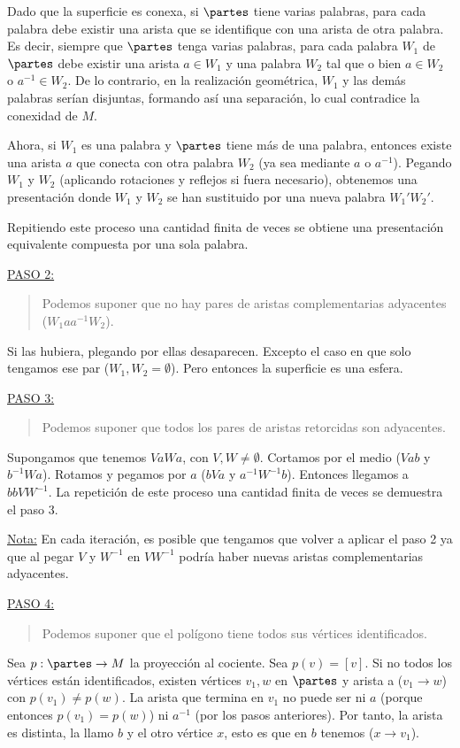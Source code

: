 {    \noindent Dado que la superficie es conexa, si $\partes$ tiene varias palabras, para cada palabra debe existir una arista que se identifique con una arista de otra palabra. 
    Es decir, siempre que $\partes$ tenga varias palabras, para cada palabra $W_1$ de $\partes$ debe existir una arista $a \in W_1$ y una palabra $W_2$ tal que 
    o bien $a\in W_2$ o $a^{-1}\in W_2$. De lo contrario, en la realización geométrica, $W_1$ y las demás palabras serían disjuntas, formando así una separación, 
    lo cual contradice la conexidad de $M$. 

    \vspace{0.5em}
    Ahora, si $W_1$ es una palabra y $\partes$ tiene más de una palabra, entonces existe una arista $a$ que conecta con otra palabra $W_2$ 
    (ya sea mediante $a$ o $a^{-1}$). Pegando $W_1$ y $W_2$ (aplicando rotaciones y reflejos si fuera necesario), 
    obtenemos una presentación donde $W_1$ y $W_2$ se han sustituido por una nueva palabra $W_1'W_2'$. 
    
    Repitiendo este proceso una cantidad finita de veces se obtiene una presentación equivalente compuesta por una sola palabra. \newline

    \underline{PASO 2:} 
    \begin{quote}
        Podemos suponer que no hay pares de aristas complementarias adyacentes ($W_1aa^{-1}W_2$).
    \end{quote}
    Si las hubiera, plegando por ellas desaparecen. Excepto el caso en que solo tengamos ese par ($W_1, W_2 = \emptyset$). Pero entonces la superficie es una esfera. \newline

    \underline{PASO 3:} 
    \begin{quote}
        Podemos suponer que todos los pares de aristas retorcidas son adyacentes.
    \end{quote}
    Supongamos que tenemos $VaWa$, con $V,W \ne \emptyset$. Cortamos por el medio ($Vab$ y $b^{-1}Wa$). Rotamos y pegamos por $a$ ($bVa$ y $a^{-1}W^{-1}b$). Entonces llegamos a $bbVW^{-1}$. La repetición de este proceso una cantidad finita de veces se demuestra el paso 3. 

    \underline{Nota:} En cada iteración, es posible que tengamos que volver a aplicar el paso 2 ya que al pegar $V$ y $W^{-1}$ en $V W^{-1}$ podría haber nuevas aristas complementarias adyacentes. \newline

    \underline{PASO 4:} 
    \begin{quote}
        Podemos suponer que el polígono tiene todos sus vértices identificados.
    \end{quote}
    Sea $p:\partes \to M$ la proyección al cociente. Sea $p(v)=[v]$. Si no todos los vértices están identificados, existen vértices $v_1, w$ en $\partes$ y arista a ($v_1 \to w$) con $p(v_1)\ne p(w)$. La arista que termina en $v_1$ no puede ser ni $a$ (porque entonces $p(v_1) = p(w)$) ni $a^{-1}$ (por los pasos anteriores). Por tanto, la arista es distinta, la llamo $b$ y el otro vértice $x$, esto es que en $b$ tenemos ($x \to v_1$). 
    
}
